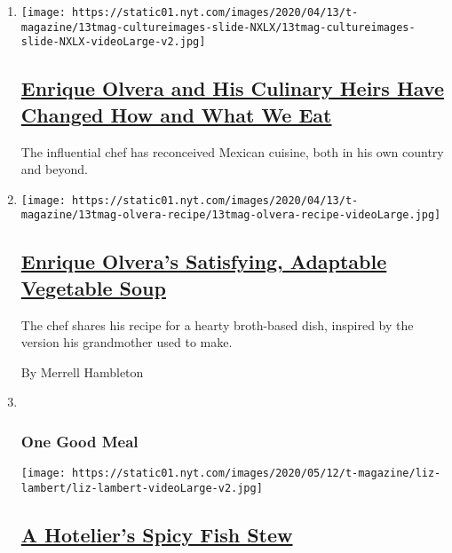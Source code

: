 \begin{enumerate}
\def\labelenumi{\arabic{enumi}.}
\item
  \texttt{[image: https://static01.nyt.com/images/2020/04/13/t-magazine/13tmag-cultureimages-slide-NXLX/13tmag-cultureimages-slide-NXLX-videoLarge-v2.jpg]}

  \hypertarget{enrique-olvera-and-his-culinary-heirs-have-changed-how-and-what-we-eat}{%
  \subsection{\texorpdfstring{\href{/interactive/2020/04/13/t-magazine/enrique-olvera-chef.html}{Enrique
  Olvera and His Culinary Heirs Have Changed How and What We
  Eat}}{Enrique Olvera and His Culinary Heirs Have Changed How and What We Eat}}\label{enrique-olvera-and-his-culinary-heirs-have-changed-how-and-what-we-eat}}

  The influential chef has reconceived Mexican cuisine, both in his own
  country and beyond.
\item
  \texttt{[image: https://static01.nyt.com/images/2020/04/13/t-magazine/13tmag-olvera-recipe/13tmag-olvera-recipe-videoLarge.jpg]}

  \hypertarget{enrique-olveras-satisfying-adaptable-vegetable-soup}{%
  \subsection{\texorpdfstring{\href{/2020/04/13/t-magazine/enrique-olvera-vegetable-soup-recipe.html}{Enrique
  Olvera's Satisfying, Adaptable Vegetable
  Soup}}{Enrique Olvera's Satisfying, Adaptable Vegetable Soup}}\label{enrique-olveras-satisfying-adaptable-vegetable-soup}}

  The chef shares his recipe for a hearty broth-based dish, inspired by
  the version his grandmother used to make.

  By Merrell Hambleton
\item ~
  \hypertarget{one-good-meal-2}{%
  \subsubsection{One Good Meal}\label{one-good-meal-2}}

  \texttt{[image: https://static01.nyt.com/images/2020/05/12/t-magazine/liz-lambert/liz-lambert-videoLarge-v2.jpg]}

  \hypertarget{a-hoteliers-spicy-fish-stew}{%
  \subsection{\texorpdfstring{\href{/2020/05/18/t-magazine/liz-lambert-bouillabaisse-recipe.html}{A
  Hotelier's Spicy Fish
  Stew}}{A Hotelier's Spicy Fish Stew}}\label{a-hoteliers-spicy-fish-stew}}


\end{enumerate}
